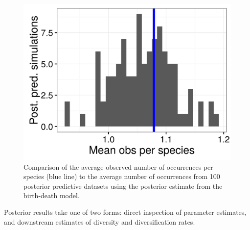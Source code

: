 \documentclass[12pt,letterpaper]{article}
\begin{document}
\begin{figure}[ht]
  \centering
  \includegraphics[width=\textwidth,height=0.4\textheight,keepaspectratio=true]{figure/pred_occ_bd}
  \caption[Posterior predictive check for birth-death model]{Comparison of the average observed number of occurrences per species (blue line) to the average number of occurrences from 100 posterior predictive datasets using the posterior estimate from the birth-death model.}
  \label{fig:ppc_birth_death}
\end{figure}



Posterior results take one of two forms: direct inspection of parameter estimates, and downstream estimates of diversity and diversification rates.
\end{document}
